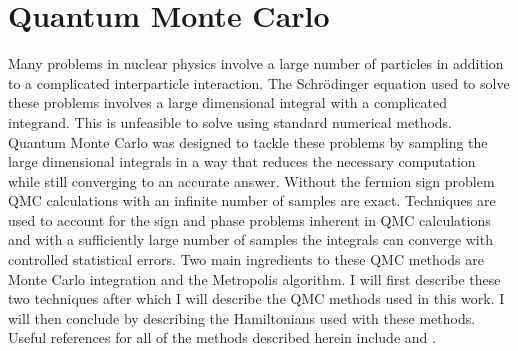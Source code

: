 \chapter{Quantum Monte Carlo}
Many problems in nuclear physics involve a large number of particles in addition to a complicated interparticle interaction. The Schr\"odinger equation used to solve these problems involves a large dimensional integral with a complicated integrand. This is unfeasible to solve using standard numerical methods. Quantum Monte Carlo was designed to tackle these problems by sampling the large dimensional integrals in a way that reduces the necessary computation while still converging to an accurate answer. Without the fermion sign problem QMC calculations with an infinite number of samples are exact. Techniques are used to account for the sign and phase problems inherent in QMC calculations and with a sufficiently large number of samples the integrals can converge with controlled statistical errors. Two main ingredients to these QMC methods are Monte Carlo integration and the Metropolis algorithm. I will first describe these two techniques after which I will describe the QMC methods used in this work. I will then conclude by describing the Hamiltonians used with these methods. Useful references for all of the methods described herein include \cite{carlson2015, foulkes2001} and \cite{pederiva2017}.

